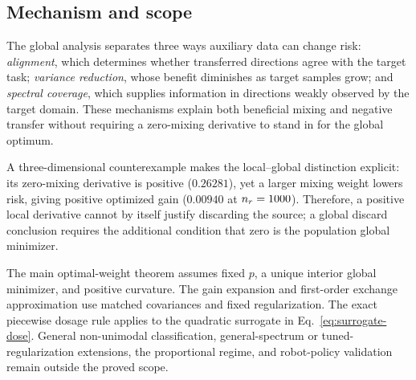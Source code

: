 \subsection{Mechanism and scope}

The global analysis separates three ways auxiliary data can change risk: \emph{alignment}, which determines whether transferred directions agree with the target task; \emph{variance reduction}, whose benefit diminishes as target samples grow; and \emph{spectral coverage}, which supplies information in directions weakly observed by the target domain. These mechanisms explain both beneficial mixing and negative transfer without requiring a zero-mixing derivative to stand in for the global optimum.

A three-dimensional counterexample makes the local--global distinction explicit: its zero-mixing derivative is positive ($0.26281$), yet a larger mixing weight lowers risk, giving positive optimized gain ($0.00940$ at $n_r=1000$). Therefore, a positive local derivative cannot by itself justify discarding the source; a global discard conclusion requires the additional condition that zero is the population global minimizer.

The main optimal-weight theorem assumes fixed $p$, a unique interior global minimizer, and positive curvature. The gain expansion and first-order exchange approximation use matched covariances and fixed regularization. The exact piecewise dosage rule applies to the quadratic surrogate in Eq.~\eqref{eq:surrogate-dose}. General non-unimodal classification, general-spectrum or tuned-regularization extensions, the proportional regime, and robot-policy validation remain outside the proved scope.
